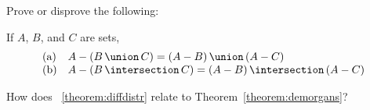 Prove or disprove the following:

\begin{stmt}\label{theorem:diffdistr}
If $A$, $B$, and $C$ are sets,
\[\begin{array}{ll} 
\textrm{(a)} &  A - (\setunion{B}{C}) = \setunion{(A-B)}{(A-C)}
\\
\textrm{(b)} & A - (\setintersection{B}{C}) = \setintersection{(A-B)}{(A-C)}
\end{array}\]
\end{stmt}

\begin{exer}
How does \stmtword~\ref{theorem:diffdistr} relate to Theorem~\ref{theorem:demorgans}?
\end{exer}

